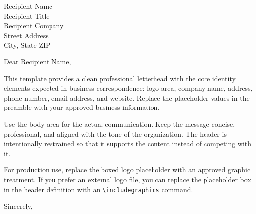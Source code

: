 \documentclass[11pt]{letter}
\date{\today}
\begin{document}
\begin{letter}{Recipient Name\\Recipient Title\\Recipient Company\\Street Address\\City, State ZIP}

\opening{Dear Recipient Name,}

\onehalfspacing
This template provides a clean professional letterhead with the core identity elements expected in business correspondence: logo area, company name, address, phone number, email address, and website. Replace the placeholder values in the preamble with your approved business information.

Use the body area for the actual communication. Keep the message concise, professional, and aligned with the tone of the organization. The header is intentionally restrained so that it supports the content instead of competing with it.

For production use, replace the boxed logo placeholder with an approved graphic treatment. If you prefer an external logo file, you can replace the placeholder box in the header definition with an \texttt{\textbackslash includegraphics} command.

\closing{Sincerely,}

\end{letter}
\end{document}

